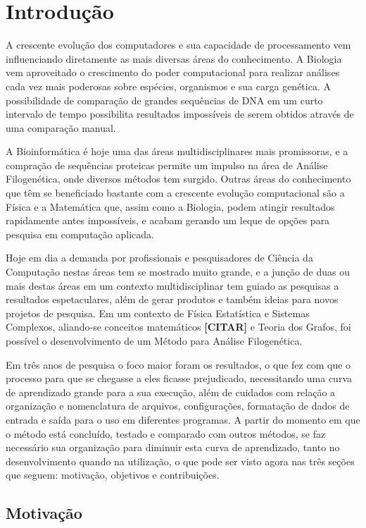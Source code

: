 \chapter{Introdução}

A crescente evolução dos computadores e sua capacidade de processamento vem influenciando diretamente as mais diversas áreas do conhecimento. A Biologia
vem aproveitado o crescimento do poder computacional para realizar análises cada vez mais poderosas sobre espécies, organismos e sua carga genética.
A possibilidade de comparação de grandes sequências de DNA em um curto intervalo de tempo possibilita resultados impossíveis de serem obtidos através
de uma comparação manual.

A Bioinformática é hoje uma das áreas multidisciplinares mais promissoras, e a compração de sequências proteicas permite um impulso na área de Análise
Filogenética, onde diversos métodos tem surgido. Outras áreas do conhecimento que têm se beneficiado bastante com a crescente evolução computacional são a
Física e a Matemática que, assim como a Biologia, podem atingir resultados rapidamente antes impossíveis, e acabam gerando um leque de opções para pesquisa
em computação aplicada.

Hoje em dia a demanda por profissionais e pesquisadores de Ciência da Computação nestas áreas tem se mostrado muito grande, e a junção de duas ou mais destas
áreas em um contexto multidisciplinar tem guiado as pesquisas a resultados espetaculares, além de gerar produtos e também ideias para novos projetos de
pesquisa. Em um contexto de Física Estatística e Sistemas Complexos, aliando-se conceitos matemáticos \textbf{[CITAR]} e Teoria dos Grafos, foi possível o
desenvolvimento de um Método para Análise Filogenética.

Em três anos de pesquisa o foco maior foram os resultados, o que fez com que o processo para que se chegasse a eles ficasse prejudicado, necessitando uma
curva de aprendizado grande para a sua execução, além de cuidados com relação a organização e nomenclatura de arquivos, configurações, formatação de dados
de entrada e saída para o uso em diferentes programas. A partir do momento em que o método está concluído, testado e comparado com outros métodos, se faz
necessário sua organização para diminuir esta curva de aprendizado, tanto no desenvolvimento quando na utilização, o que pode ser visto agora nas três
seções que seguem: motivação, objetivos e contribuições.

\section{Motivação}

